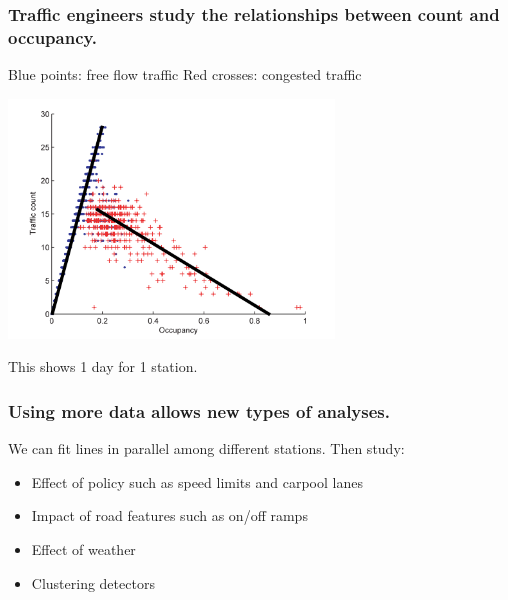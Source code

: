 \documentclass{beamer}
\begin{document}
\begin{frame}

    \frametitle{Traffic engineers study the relationships between count and
    occupancy.}

    Blue points: free flow traffic
    Red crosses: congested traffic

\centerline{\includegraphics[height=2.5in]{fundamental_diagram.png}}

This shows 1 day for 1 station.

\end{frame}
\begin{frame}

    \frametitle{Using more data allows new types of analyses.}


We can fit lines in parallel among different stations. Then study:

    \begin{itemize}
        \item Effect of policy such as speed limits and carpool lanes
        \item Impact of road features such as on/off ramps
        \item Effect of weather
        \item Clustering detectors
    \end{itemize}

\end{frame}
\end{document}
